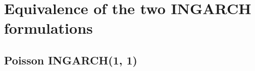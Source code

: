 \documentclass{article}
\begin{document}
%
%
%
%

\appendix
\section{Equivalence of the two INGARCH formulations}
\label{appendix:proof}

\subsection{Poisson INGARCH(1, 1)}
\label{subsec:derication_poisson11}
\end{document}
